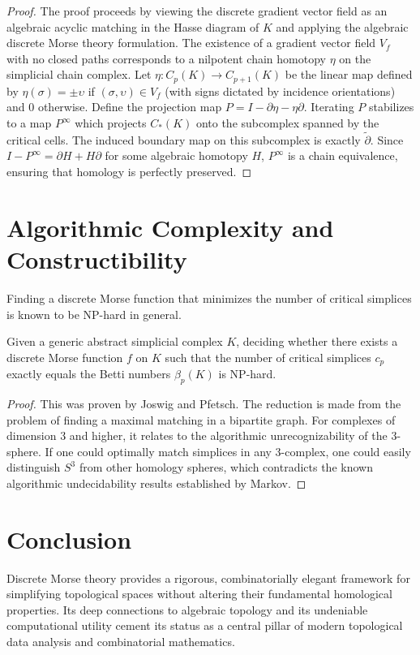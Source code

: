 \begin{proof}
The proof proceeds by viewing the discrete gradient vector field as an algebraic acyclic matching in the Hasse diagram of $K$ and applying the algebraic discrete Morse theory formulation. The existence of a gradient vector field $V_f$ with no closed paths corresponds to a nilpotent chain homotopy $\eta$ on the simplicial chain complex.
Let $\eta : C_p(K) \to C_{p+1}(K)$ be the linear map defined by $\eta(\sigma) = \pm \upsilon$ if $(\sigma, \upsilon) \in V_f$ (with signs dictated by incidence orientations) and $0$ otherwise.
Define the projection map $P = I - \partial \eta - \eta \partial$. Iterating $P$ stabilizes to a map $P^\infty$ which projects $C_*(K)$ onto the subcomplex spanned by the critical cells. The induced boundary map on this subcomplex is exactly $\tilde{\partial}$. Since $I - P^\infty = \partial H + H \partial$ for some algebraic homotopy $H$, $P^\infty$ is a chain equivalence, ensuring that homology is perfectly preserved.
\end{proof}

\section{Algorithmic Complexity and Constructibility}

Finding a discrete Morse function that minimizes the number of critical simplices is known to be NP-hard in general.

\begin{theorem}
\label{thm:np_hard}
Given a generic abstract simplicial complex $K$, deciding whether there exists a discrete Morse function $f$ on $K$ such that the number of critical simplices $c_p$ exactly equals the Betti numbers $\beta_p(K)$ is NP-hard.
\end{theorem}

\begin{proof}
This was proven by Joswig and Pfetsch. The reduction is made from the problem of finding a maximal matching in a bipartite graph. For complexes of dimension 3 and higher, it relates to the algorithmic unrecognizability of the 3-sphere. If one could optimally match simplices in any 3-complex, one could easily distinguish $S^3$ from other homology spheres, which contradicts the known algorithmic undecidability results established by Markov.
\end{proof}

\section{Conclusion}

Discrete Morse theory provides a rigorous, combinatorially elegant framework for simplifying topological spaces without altering their fundamental homological properties. Its deep connections to algebraic topology and its undeniable computational utility cement its status as a central pillar of modern topological data analysis and combinatorial mathematics.
